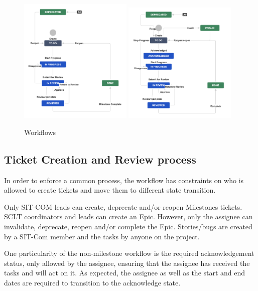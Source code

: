 \documentclass[SE,authoryear,toc]{lsstdoc}
\begin{document}
\begin{figure}[h]
\begin{center}
\includegraphics[width=0.48\textwidth]{WorkFlowMilestones.png}
\includegraphics[width=0.48\textwidth]{WorkFlowNonMilestones.png}
\caption{\label{fig:workflow} Workflows}
\end{center}
\end{figure}


\subsection{Ticket Creation and Review process}
In order to enforce a common process, the workflow has constraints on who is allowed to create tickets and move them to different state transition. 

Only SIT-COM leads can create, deprecate and/or reopen Milestones tickets. SCLT coordinators and leads can create an Epic. However, only the assignee can invalidate, deprecate, reopen and/or complete the Epic. Stories/bugs are created by a SIT-Com member and the tasks by anyone on the project. 

One particularity of the non-milestone workflow is the required acknowledgement status, only allowed by the assignee, ensuring that the assignee has received the tasks and will act on it. As expected, the assignee as well as the start and end dates are required to transition to the acknowledge state.
\end{document}
